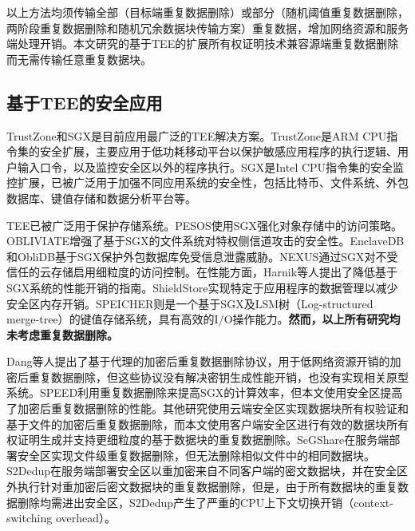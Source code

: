 以上方法均须传输全部（目标端重复数据删除）或部分（随机阈值重复数据删除，两阶段重复数据删除和随机冗余数据块传输方案）重复数据，增加网络资源和服务端处理开销。本文研究的基于TEE的扩展所有权证明技术兼容源端重复数据删除而无需传输任意重复数据块。 

\subsection{基于TEE的安全应用}
\label{subsec:compare-tee}

TrustZone和SGX是目前应用最广泛的TEE解决方案\cite{pinto19}。TrustZone是ARM CPU指令集的安全扩展，主要应用于低功耗移动平台以保护敏感应用程序的执行逻辑\cite{rubinov2016automated}、用户输入口令\cite{ying2018truz}，以及监控安全区以外的程序执行\cite{azab2014hypervision}。SGX是Intel CPU指令集的安全监控扩展，已被广泛用于加强不同应用系统的安全性，包括比特币\cite{matetic19}、文件系统\cite{ahmad2018OBLIVIATE,shinde20}、外包数据库\cite{eskandarian17,priebe18,sun21}、键值存储\cite{mishra2018Oblix,bailleu2019SPEICHER,kim19,bailleu2021Avocado}和数据分析平台\cite{schuster15, zheng2017Opaque, bowe2020ZEXE}等。

TEE已被广泛用于保护存储系统。PESOS\cite{krahn18}使用SGX强化对象存储中的访问策略。OBLIVIATE\cite{ahmad2018OBLIVIATE}增强了基于SGX的文件系统对特权侧信道攻击的安全性。EnclaveDB\cite{priebe18}和ObliDB\cite{eskandarian19}基于SGX保护外包数据库免受信息泄露威胁。NEXUS\cite{djoko2019NEXUS}通过SGX对不受信任的云存储启用细粒度的访问控制。在性能方面，Harnik等人\cite{harnik18}提出了降低基于SGX系统的性能开销的指南。ShieldStore\cite{kim19}实现特定于应用程序的数据管理以减少安全区内存开销。SPEICHER\cite{bailleu2019SPEICHER}则是一个基于SGX及LSM树（Log-structured merge-tree）\cite{LSMT}的键值存储系统，具有高效的I/O操作能力。\textbf{然而，以上所有研究均未考虑重复数据删除。}

Dang等人\cite{dang2017Privacy}提出了基于代理的加密后重复数据删除协议，用于低网络资源开销的加密后重复数据删除，但这些协议没有解决密钥生成性能开销，也没有实现相关原型系统。SPEED\cite{cui2019SPEED}利用重复数据删除来提高SGX的计算效率，但本文使用安全区提高了加密后重复数据删除的性能。其他研究使用云端安全区实现数据块所有权验证\cite{you2020Proofs}和基于文件的加密后重复数据删除\cite{fuhry20}，而本文使用客户端安全区进行有效的数据块所有权证明生成并支持更细粒度的基于数据块的重复数据删除。SeGShare\cite{fuhry2020segshare}在服务端部署安全区实现文件级重复数据删除，但无法删除相似文件中的相同数据块。S2Dedup\cite{miranda2021S2Dedup}在服务端部署安全区以重加密来自不同客户端的密文数据块，并在安全区外执行针对重加密后密文数据块的重复数据删除，但是，由于所有数据块的重复数据删除均需进出安全区，S2Dedup产生了严重的CPU上下文切换开销（context-switching overhead）\cite{weisse2017regaining}。

